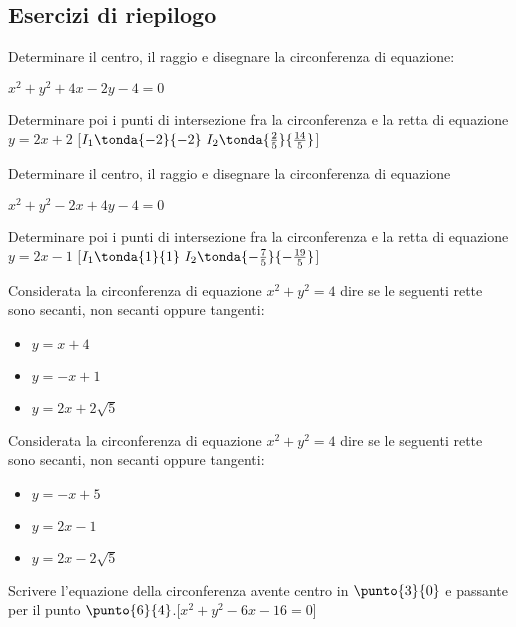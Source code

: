 \subsection{Esercizi di riepilogo}

\begin{esercizio}\label{ese:}
Determinare il centro, il raggio e disegnare la circonferenza di equazione:

\(x^2+y^2+4x-2y-4=0\)

Determinare poi i punti di intersezione fra la circonferenza e la retta di 
equazione 
\(y=2x+2\) 
\hfill [\(I_1\tonda{-2}{-2}~I_2\tonda{\frac{2}{5}}{\frac{14}{5}}\)]
\end{esercizio}

\begin{esercizio}\label{ese:}
Determinare il centro, il raggio e disegnare la circonferenza di equazione

\(x^2+y^2-2x+4y-4=0\)

Determinare poi i punti di intersezione fra la circonferenza e la retta di 
equazione \(y=2x-1\) 
\hfill [\(I_1\tonda{1}{1}~I_2\tonda{-\frac{7}{5}}{-\frac{19}{5}}\)]
\end{esercizio}

\begin{esercizio}\label{ese:}
Considerata la circonferenza di equazione \(x^2 +y^2 = 4\) dire se le seguenti 
rette sono secanti, non secanti oppure tangenti:
\begin{itemize} [nosep]
 \item \(y=x+4\)
 \item \(y=-x+1\)
 \item \(y=2x+2\sqrt{5}\)
\end{itemize}
\end{esercizio}

\begin{esercizio}\label{ese:}
Considerata la circonferenza di equazione \(x^2 +y^2 = 4\) dire se le seguenti 
rette sono secanti, non secanti oppure tangenti:
\begin{itemize} [nosep]
 \item \(y=-x+5\)
 \item \(y=2x-1\)
 \item \(y=2x-2\sqrt{5}\)
\end{itemize}
\end{esercizio}

\begin{esercizio}\label{ese:}
Scrivere l'equazione della circonferenza avente centro in \(\punto{3}{0}\) e 
passante per il punto \(\punto{6}{4}\).\hfill[\(x^2+y^2-6x-16=0\)]
\end{esercizio}

